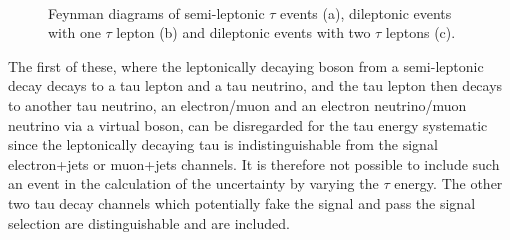 \begin{figure}%
	\centering
	\\
	\caption[Diagrams of semi-leptonic and dileptonic $\tau$ events.]{Feynman diagrams of semi-leptonic $\tau$
	events (a), dileptonic events with one $\tau$ lepton (b) and dileptonic events with two $\tau$ leptons (c).}
	\label{fig:tau_diagrams}
\end{figure}

The first of these, where the leptonically decaying \W boson from a semi-leptonic \ttbar decay decays to a tau
lepton and a tau neutrino, and the tau lepton then decays to another tau neutrino, an electron/muon and an
electron neutrino/muon neutrino via a virtual \W boson, can be disregarded for the tau energy systematic since
the leptonically decaying tau is indistinguishable from the signal electron+jets or muon+jets channels.
It is therefore not possible to include such an event in the calculation of the \met uncertainty by varying
the $\tau$ energy. The other two tau decay channels which potentially fake the signal and pass the \ttbar
signal selection are distinguishable and are included.

